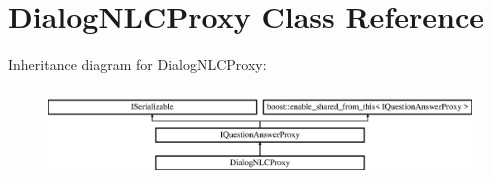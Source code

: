 \hypertarget{class_dialog_n_l_c_proxy}{}\section{Dialog\+N\+L\+C\+Proxy Class Reference}
\label{class_dialog_n_l_c_proxy}
Inheritance diagram for Dialog\+N\+L\+C\+Proxy\+:\begin{figure}[H]
\begin{center}
\leavevmode
\includegraphics[height=2.393162cm]{class_dialog_n_l_c_proxy}
\end{center}
\end{figure}
